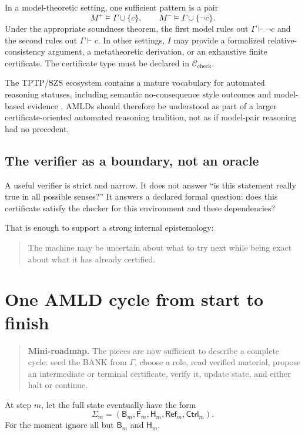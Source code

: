 \documentclass[11pt,openany]{book}
\theoremstyle{definition}
\theoremstyle{remark}
\newenvironment{miniroadmap}{\begin{quote}\small\color{deepblue}\textbf{Mini-roadmap.} }{\end{quote}}
\newcommand{\Bank}{\mathsf{B}}
\newcommand{\Future}{\mathsf{F}}
\newcommand{\Hist}{\mathsf{H}}
\newcommand{\State}{\Sigma}
\newcommand{\Refl}{\mathsf{Ref}}
\begin{document}
In a model-theoretic setting, one sufficient pattern is a pair
\[
M^+\models\Gamma\cup\{c\},
\qquad
M^-\models\Gamma\cup\{\neg c\}.
\]
Under the appropriate soundness theorem, the first model rules out $\Gamma\vdash\neg c$ and the second rules out $\Gamma\vdash c$. In other settings, $I$ may provide a formalized relative-consistency argument, a metatheoretic derivation, or an exhaustive finite certificate. The certificate type must be declared in $\mathcal C_{\mathrm{check}}$.

The TPTP/SZS ecosystem contains a mature vocabulary for automated reasoning statuses, including semantic no-consequence style outcomes and model-based evidence \cite{TPTPQuick,TPTPLanguage}. AMLDs should therefore be understood as part of a larger certificate-oriented automated reasoning tradition, not as if model-pair reasoning had no precedent.

\section{The verifier as a boundary, not an oracle}
A useful verifier is strict and narrow. It does not answer ``is this statement really true in all possible senses?'' It answers a declared formal question: does this certificate satisfy the checker for this environment and these dependencies?

That is enough to support a strong internal epistemology:
\begin{quote}
The machine may be uncertain about what to try next while being exact about what it has already certified.
\end{quote}

\chapter{One AMLD cycle from start to finish}
\begin{miniroadmap}
The pieces are now sufficient to describe a complete cycle: seed the BANK from $\Gamma$, choose a role, read verified material, propose an intermediate or terminal certificate, verify it, update state, and either halt or continue.
\end{miniroadmap}

At step $m$, let the full state eventually have the form
\[
\State_m=(\Bank_m,\Future_m,\Hist_m,\Refl_m,\mathsf{Ctrl}_m).
\]
For the moment ignore all but $\Bank_m$ and $\Hist_m$.
\end{document}
